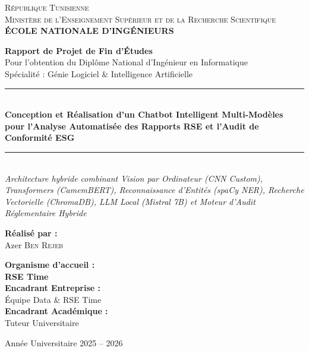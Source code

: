 \documentclass[12pt,a4paper]{report}
\begin{document}
\begin{titlepage}
    \centering
    {\scshape\Large République Tunisienne\\
    Ministère de l'Enseignement Supérieur et de la Recherche Scientifique\\[0.5cm]
    \textbf{ÉCOLE NATIONALE D'INGÉNIEURS}\\[1.5cm]}

    {\Huge \textbf{Rapport de Projet de Fin d'Études}\\}
    {\Large Pour l'obtention du Diplôme National d'Ingénieur en Informatique\\}
    {\large Spécialité : Génie Logiciel \& Intelligence Artificielle\\[1.2cm]}

    \rule{\linewidth}{0.6mm}\\[0.4cm]
    {\LARGE \textbf{Conception et Réalisation d'un Chatbot Intelligent Multi-Modèles pour l'Analyse Automatisée des Rapports RSE et l'Audit de Conformité ESG}\\}
    \rule{\linewidth}{0.6mm}\\[0.6cm]

    {\large \textit{Architecture hybride combinant Vision par Ordinateur (CNN Custom), Transformers (CamemBERT), Reconnaissance d'Entités (spaCy NER), Recherche Vectorielle (ChromaDB), LLM Local (Mistral 7B) et Moteur d'Audit Réglementaire Hybride}}

    \vfill

    \begin{minipage}{0.48\textwidth}
        \begin{flushleft} \large
            \textbf{Réalisé par :}\\
            Azer \textsc{Ben Rejeb}
        \end{flushleft}
    \end{minipage}
    \begin{minipage}{0.48\textwidth}
        \begin{flushright} \large
            \textbf{Organisme d'accueil :}\\
            \textbf{RSE Time}\\
            \vspace{0.2cm}
            \textbf{Encadrant Entreprise :}\\
            Équipe Data \& RSE Time\\
            \vspace{0.2cm}
            \textbf{Encadrant Académique :}\\
            Tuteur Universitaire
        \end{flushright}
    \end{minipage}

    \vfill
    {\large Année Universitaire 2025 -- 2026}
\end{titlepage}
\end{document}
